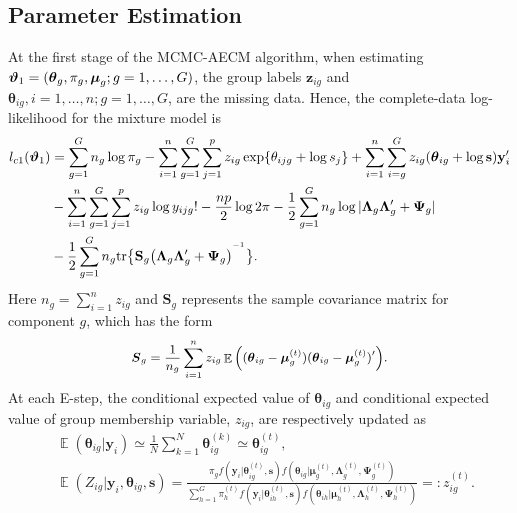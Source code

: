 \documentclass[12pt]{article}
\newcommand{\vecmu}{\mbox{\boldmath$\mu$}}
\newcommand{\inv}{^{\raisebox{.2ex}{$\scriptscriptstyle-1$}}}
\DeclareMathOperator{\E}{\mathbb{E}}
\begin{document}
\subsection{Parameter Estimation}
At the first stage of the MCMC-AECM algorithm, when estimating $\boldsymbol{\vartheta}_1 = (\boldsymbol{\theta}_{g}, \pi_g, \vecmu_g; g = 1, \ldots, G)$, the group labels $\mathbf{z}_{ig}$ and $\boldsymbol{\theta}_{ig}, i = 1, \ldots, n; g = 1,\ldots,G$, are the missing data. Hence, the complete-data log-likelihood for the mixture model is
\begin{equation*}
\label{lc1}
\begin{split}
l_{c1}(\boldsymbol{\vartheta}_1) &= \sum_{g=1}^G  n_g \log \pi_g - \sum_{i=1}^n \sum_{g=1}^G \sum_{j=1}^p z_{ig} \exp \{\theta_{ijg} + \log s_j\} + \sum_{i=1}^n \sum_{i=g}^G z_{ig}  (\boldsymbol{\theta}_{ig} + \log \mathbf{s}) \mathbf{y}_i^{\prime}\\
& - \sum_{i=1}^n \sum_{g=1}^G \sum_{j=1}^p z_{ig} \log y_{ijg} ! - \frac{np}{2} \log 2 \pi - \frac{1}{2} \sum_{g=1}^G n_g \log | \mathbf{\Lambda}_g \mathbf{\Lambda}_g^{\prime} + \mathbf{\Psi}_g| \\ 
& - \frac{1}{2} \sum_{g=1}^G n_g \text{tr} \big\{ \mathbf{S}_g \big( \mathbf{\Lambda}_g \mathbf{\Lambda}_g^{\prime} + \mathbf{\Psi}_g \big)^{\inv} \big\}.
\end{split}
\end{equation*}
Here $n_g = \sum_{i=1}^n z_{ig}$ and $\boldsymbol{S}_g$ represents the sample covariance matrix for component $g$, which has the form
\begin{equation}
\label{sample_covariance_matrix1}
     \small \boldsymbol{S}_g  = \frac{1}{n_g} \sum_{i=1}^n z_{ig} \E \Big((\boldsymbol{\theta}_{ig} - \boldsymbol{\mu}_g^{(t)}) (\boldsymbol{\theta}_{ig} - \boldsymbol{\mu}_g^{(t)})^{\prime}\Big).
\end{equation}
At each E-step, the conditional expected value of $\boldsymbol{\theta}_{ig}$ and conditional expected value of group membership variable, $z_{ig}$, are respectively updated as
\begin{equation}
\label{exptheta}
\begin{split}
& \E (\boldsymbol{\theta}_{ig} |\mathbf{y}_i) \simeq \frac{1} {N}\sum_{k=1}^N \boldsymbol{\theta}_{ig}^{(k)}  \simeq \boldsymbol{\theta}^{(t)}_{ig}, \\
& \E (Z_{ig} |\mathbf{y}_i, \boldsymbol{\theta}_{ig}, \mathbf{s}) = \frac{\pi_g f(\mathbf{y}_{i}| \boldsymbol{\theta}_{ig}^{(t)}, \mathbf{s})  f(\boldsymbol{\theta}_{ig}|\boldsymbol{\mu}_g^{(t)},\mathbf{\Lambda}_g^{(t)}, \mathbf{\Psi}_g^{(t)})}{\sum_{h=1}^G \pi_h^{(t)} f(\mathbf{y}_{i} |\boldsymbol{\theta}_{ih}^{(t)}, \mathbf{s})  f(\boldsymbol{\theta}_{ih}| \boldsymbol{\mu}_h^{(t)},\mathbf{\Lambda}_h^{(t)}, \mathbf{\Psi}_h^{(t)})} =: z_{ig}^{(t)}.
\end{split}
\end{equation}
\end{document}
